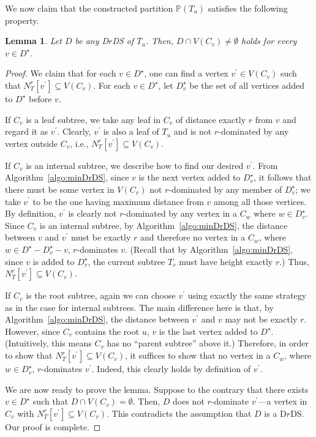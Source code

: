 \documentclass[a4paper]{article}
\theoremstyle{plain}
\newtheorem{lemma}[theorem]{Lemma}
\theoremstyle{definition}
\begin{document}
We now claim that the constructed partition $\mathbb{P}(T_u)$ satisfies the following property.
\begin{lemma}\label{lem:partition-tree}
    Let $D$ be any D$r$DS of $T_u$.
	Then, $D \cap V(C_v) \neq \emptyset$ holds for every $v \in D^\star$. 
\end{lemma}
\begin{proof}
We claim that for each $v \in D^\star$, one can find a vertex $v^\prime \in V(C_v)$ such that $N^r_T[v^\prime] \subseteq V(C_v)$.
For each $v \in D^\star$, let $D^\star_v$ be the set of all vertices added to $D^\star$ before $v$.

If $C_v$ is a leaf subtree, we take any leaf in $C_v$ of distance exactly $r$ from $v$ and regard it as $v^\prime$.
Clearly, $v^\prime$ is also a leaf of $T_u$ and is not $r$-dominated by any vertex outside $C_v$, i.e., $N^r_T[v^\prime] \subseteq V(C_v)$.

If $C_v$ is an internal subtree, we describe how to find our desired $v^\prime$.
From Algorithm~\ref{algo:minDrDS}, since $v$ is the next vertex added to $D^\star_v$, it follows that there must be some vertex in $V(C_v)$ not $r$-dominated by any member of $D^\star_v$; we take $v^\prime$ to be the one having maximum distance from $v$ among all those vertices.
By definition, $v^\prime$ is clearly not $r$-dominated by any vertex in a $C_w$ where $w \in D^\star_v$.
Since $C_v$ is an internal subtree, by Algorithm~\ref{algo:minDrDS}, the distance between $v$ and $v^\prime$ must be exactly $r$ and therefore no vertex in a $C_w$, where $w \in D^\star - D^\star_v - v$, $r$-dominates $v$.
(Recall that by Algorithm~\ref{algo:minDrDS}, since $v$ is added to $D^\star_v$, the current subtree $T_v$ must have height exactly $r$.)
Thus, $N_T^r[v^\prime] \subseteq V(C_v)$.

If $C_v$ is the root subtree, again we can choose $v^\prime$ using exactly the same strategy as in the case for internal subtrees.
The main difference here is that, by Algorithm~\ref{algo:minDrDS}, the distance between $v^\prime$ and $v$ may not be exactly $r$.
However, since $C_v$ contains the root $u$, $v$ is the last vertex added to $D^\star$.
(Intuitively, this means $C_v$ has no ``parent subtree'' above it.)
Therefore, in order to show that $N_T^r[v^\prime] \subseteq V(C_v)$, it suffices to show that no vertex in a $C_w$, where $w \in D^\star_v$, $r$-dominates $v^\prime$.
Indeed, this clearly holds by definition of $v^\prime$.

We are now ready to prove the lemma.
Suppose to the contrary that there exists $v \in D^\star$ such that $D \cap V(C_v) = \emptyset$.
Then, $D$ does not $r$-dominate $v^\prime$---a vertex in $C_v$ with $N_T^r[v^\prime] \subseteq V(C_v)$.
This contradicts the assumption that $D$ is a D$r$DS.
Our proof is complete.
\end{proof}
\end{document}
